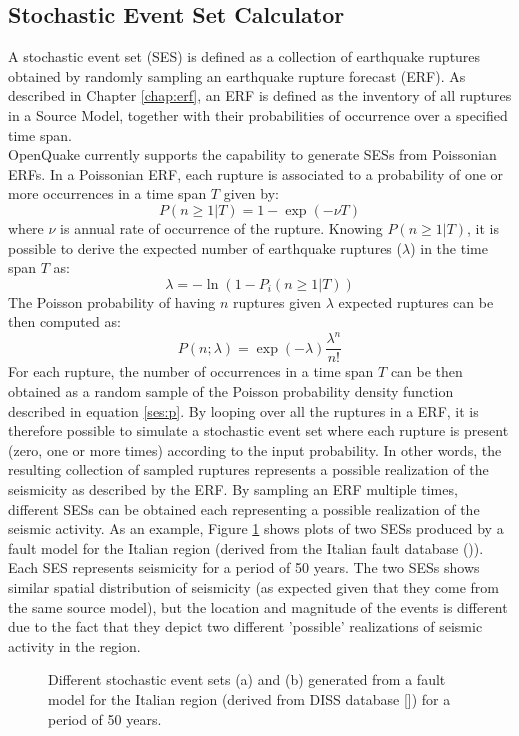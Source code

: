 \subsection{Stochastic Event Set Calculator}
A stochastic event set (SES) is defined as a collection of earthquake ruptures obtained by randomly sampling an earthquake rupture forecast (ERF). As described in Chapter \ref{chap:erf}, an ERF is defined as the inventory of all ruptures in a Source Model, together with their probabilities of occurrence over a specified time span.\\
OpenQuake currently supports the capability to generate SESs from Poissonian ERFs. In a Poissonian ERF, each rupture is associated to a probability of one or more occurrences in a time span $T$ given by:
\begin{equation}
P(n\geq1|T) = 1 - \exp(-\nu T)
\end{equation} 
where $\nu$ is annual rate of occurrence of the rupture. Knowing $P(n\geq1|T)$, it is possible to derive the expected number of earthquake ruptures ($\lambda$) in the time span $T$  as:
\begin{equation}
\lambda = - \ln(1 - P_{i}(n\geq1|T))
\end{equation} 
The Poisson probability of having $n$ ruptures given $\lambda$ expected ruptures can be then computed as:
\begin{equation}
P(n;\lambda) = \exp(-\lambda)\frac{\lambda^{n}}{n!}
\label{ses:p}
\end{equation}
For each rupture, the number of occurrences in a time span $T$ can be then obtained as a random sample of the Poisson probability density function described in equation \ref{ses:p}. By looping over all the ruptures in a ERF, it is therefore possible to simulate a stochastic event set where each rupture is present (zero, one or more times) according to the input probability. In other words, the resulting collection of sampled ruptures represents a possible realization of the seismicity as described by the ERF. By sampling an ERF multiple times, different SESs can be obtained each representing a possible realization of the seismic activity. As an example, Figure \ref{ses_italy} shows plots of two SESs produced by a fault model for the Italian region (derived from the Italian fault database (\cite{basili2008})). Each SES represents seismicity for a period of 50 years. The two SESs shows similar spatial distribution of seismicity (as expected given that they come from the same source model), but the location and magnitude of the events is different due to the fact that they depict two different 'possible' realizations of seismic activity in the region.\\
\begin{figure}[!htbp]
\begin{center}
\caption{Different stochastic event sets (a) and (b) generated from a fault model for the Italian region (derived from DISS database [\cite{basili2008}]) for a period of 50 years.}
\label{ses_italy}
\end{center}
\end{figure}


